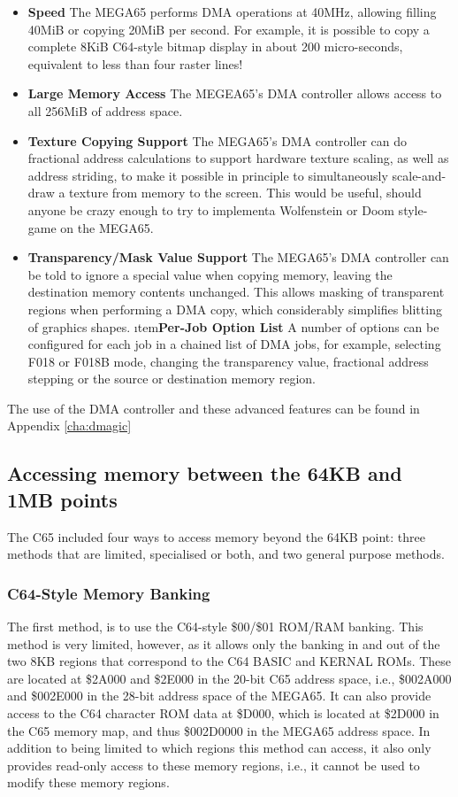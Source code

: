 \begin{itemize}
\item{\bf Speed} The MEGA65 performs DMA operations at 40MHz, allowing filling 40MiB or copying 20MiB
  per second.  For example, it is possible to copy a complete 8KiB C64-style bitmap display in
  about 200 micro-seconds, equivalent to less than four raster lines!
 \item{\bf Large Memory Access} The MEGEA65's DMA controller allows access to all 256MiB of address space.
\item{\bf Texture Copying Support} The MEGA65's DMA controller can do fractional address calculations
  to support hardware texture scaling, as well as address striding, to make it possible in principle
  to simultaneously scale-and-draw a texture from memory to the screen. This would be useful, should
  anyone be crazy enough to try to implementa Wolfenstein or Doom style-game on the MEGA65.
\item{\bf Transparency/Mask Value Support} The MEGA65's DMA controller can be told to ignore a special value
   when copying memory, leaving the destination memory contents unchanged. This allows masking of transparent
   regions when performing a DMA copy, which considerably simplifies blitting of graphics shapes.
\i tem{\bf Per-Job Option List} A number of options can be configured for each job in a chained list of DMA
  jobs, for example, selecting F018 or F018B mode, changing the transparency value, fractional address stepping
  or the source or destination memory region.
\end{itemize}

The use of the DMA controller and these advanced features can be found in Appendix \ref{cha:dmagic}

\subsection{Accessing memory between the 64KB and 1MB points}

The C65 included four ways to access memory beyond the 64KB point: three methods
that are limited, specialised or both, and two general purpose methods.
 
\subsubsection{C64-Style Memory Banking}

The first method, is to use the C64-style \$00/\$01 ROM/RAM banking.
This method is very limited, however, as it allows only the banking in
and out of the two 8KB regions that correspond to the C64 BASIC and
KERNAL ROMs.  These are located at \$2A000 and \$2E000 in the 20-bit
C65 address space, i.e., \$002A000 and \$002E000 in the 28-bit address
space of the MEGA65.  It can also provide access to the C64 character ROM
data at \$D000, which is located at \$2D000 in the C65 memory map, and thus \$002D0000 in
the MEGA65 address space.  In addition to being limited to which regions this
method can access, it also only provides read-only access
to these memory regions, i.e., it cannot be used to modify these memory regions.
 
